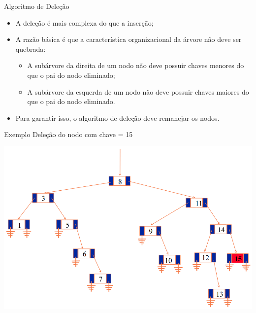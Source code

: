 \documentclass[12pt,table,xcolor={dvipsnames}]{beamer}
\begin{document}
\begin{frame}[fragile]{Algoritmo de Deleção}
          \begin{itemize}
          \item A deleção é mais complexa do que a inserção;
		  \item A razão básica é que a característica organizacional da árvore não deve ser quebrada:
		  \begin{itemize}
		  \item A subárvore da direita de um nodo não deve possuir chaves menores do que o pai do nodo eliminado;
		  \item A subárvore da esquerda de um nodo não deve possuir chaves maiores do que o pai do nodo eliminado.
		  \end{itemize}
		  \item Para garantir isso, o algoritmo de deleção deve remanejar os nodos.
       	  \end{itemize}
\end{frame}

\begin{frame}[fragile]{Exemplo}
Deleção do nodo com chave = 15
\begin{center}
\includegraphics[scale=.3]{arv8.png} 
\end{center}
\end{frame}
\end{document}
